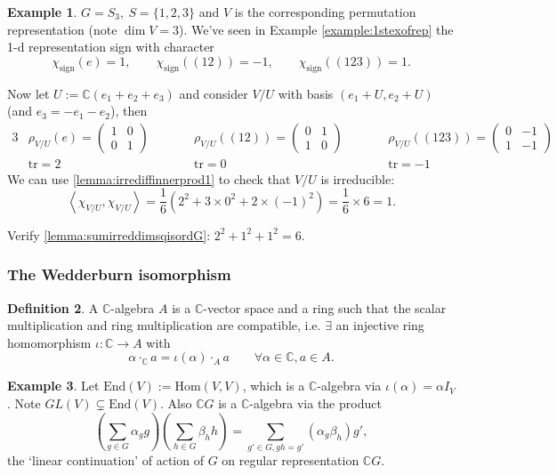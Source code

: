\documentclass{article}
\newcommand{\tr}{\text{tr}}
\newcommand{\la}{\left\langle}
\newcommand{\ra}{\right\rangle}
\newcommand{\C}{\mathbb{C}}
\newcommand{\End}{\text{End}}
\newcommand{\Hom}{\text{Hom}}
\theoremstyle{definition}
\newtheorem{defn}{Definition}[subsection]
\newtheorem{example}[defn]{Example}
\begin{document}
\begin{example}
$G=S_3,\ S=\{1,2,3\}$ and $V$ is the corresponding permutation representation (note $\dim V=3$). We've seen in Example \ref{example:1stexofrep} the 1-d representation sign with character
\[
\chi_{\text{sign}}(e)=1,\qquad \chi_{\text{sign}}((12))=-1,\qquad \chi_{\text{sign}}((123))=1.
\]

Now let $U:=\C(e_1+e_2+e_3)$ and consider $V/U$ with basis $(e_1+U,e_2+U)$ (and $e_3=-e_1-e_2$), then
\begin{alignat*}{3}
&\rho_{V/U}(e)=\begin{pmatrix}1&0\\0&1\end{pmatrix}\qquad &&\rho_{V/U}((12))=\begin{pmatrix}0&1\\1&0\end{pmatrix}\qquad&&\rho_{V/U}((123))=\begin{pmatrix}0&-1\\1&-1\end{pmatrix}\\
&\tr=2 &&\tr=0 &&\tr=-1
\end{alignat*}
We can use \ref{lemma:irrediffinnerprod1} to check that $V/U$ is irreducible:
\[
\la\chi_{V/U},\chi_{V/U}\ra=\frac16\left(2^2+3\times 0^2+2\times(-1)^2\right)=\frac16\times 6=1.
\]

Verify \ref{lemma:sumirreddimsqisordG}: $2^2+1^2+1^2=6.$
\end{example}

\subsubsection{The Wedderburn isomorphism}
\begin{defn}
A $\C$-algebra $A$ is a $\C$-vector space and a ring such that the scalar multiplication and ring multiplication are compatible, i.e. $\exists$ an injective ring homomorphism $\iota:\C\rightarrow A$ with
\[
\alpha\cdot_\C a=\iota(\alpha)\cdot_A a \qquad \forall \alpha\in\C,a\in A.
\]
\end{defn}

\begin{example}
Let $\End(V):=\Hom(V,V)$, which is a $\C$-algebra via $\iota(\alpha)=\alpha I_V$. Note $GL(V)\subsetneq \End(V)$. Also $\C G$ is a $\C$-algebra via the product
\[
\left(\sum_{g\in G}\alpha_g g\right)\left(\sum_{h\in G}\beta_h h\right)=\sum_{g'\in G,gh=g'}(\alpha_g\beta_h)g',
\]
the `linear continuation' of action of $G$ on regular representation $\C G$.
\end{example}
\end{document}
